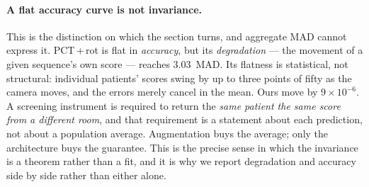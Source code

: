 \documentclass[10pt,journal]{IEEEtran}
\begin{document}
\paragraph{A flat accuracy curve is not invariance.} This is the distinction on which the section
turns, and aggregate MAD cannot express it. PCT\,+\,rot is flat in \emph{accuracy}, but its
\emph{degradation} --- the movement of a given sequence's own score --- reaches $\mathbf{3.03}$~MAD.
Its flatness is statistical, not structural: individual patients' scores swing by up to three points
of fifty as the camera moves, and the errors merely cancel in the mean. Ours move by
$9\times10^{-6}$. A screening instrument is required to return the \emph{same patient the same score
from a different room}, and that requirement is a statement about each prediction, not about a
population average. Augmentation buys the average; only the architecture buys the guarantee. This is
the precise sense in which the invariance is a theorem rather than a fit, and it is why we report
degradation and accuracy side by side rather than either alone.
\end{document}
